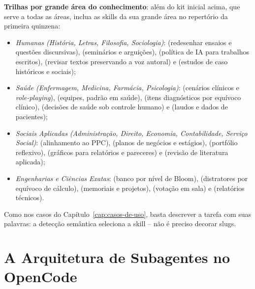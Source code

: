 \begin{adaptacaoarea}
\textbf{Trilhas por grande {\'a}rea do conhecimento}: al{\'e}m do kit inicial acima, que serve a todas as {\'a}reas, inclua as skills da sua grande {\'a}rea no repert{\'o}rio da primeira quinzena:
\begin{itemize}
  \item \emph{Humanas (Hist{\'o}ria, Letras, Filosofia, Sociologia)}:  (redesenhar ensaios e quest{\~o}es discursivas),  (semin{\'a}rios e argui{\c c}{\~o}es),  (pol{\'i}tica de IA para trabalhos escritos),  (revisar textos preservando a voz autoral) e  (estudos de caso hist{\'o}ricos e sociais);
  \item \emph{Sa{\'u}de (Enfermagem, Medicina, Farm{\'a}cia, Psicologia)}:  (cen{\'a}rios cl{\'i}nicos e \emph{role-playing}),  (equipes, padr{\~a}o em sa{\'u}de),  (itens diagn{\'o}sticos por equ{\'i}voco cl{\'i}nico),  (decis{\~o}es de sa{\'u}de sob controle humano) e  (laudos e dados de pacientes);
  \item \emph{Sociais Aplicadas (Administra{\c c}{\~a}o, Direito, Economia, Contabilidade, Servi{\c c}o Social)}:  (alinhamento ao PPC),  (planos de neg{\'o}cios e est{\'a}gios),  (portf{\'o}lio reflexivo),  (gr{\'a}ficos para relat{\'o}rios e pareceres) e  (revis{\~a}o de literatura aplicada);
  \item \emph{Engenharias e Ci{\^e}ncias Exatas}:  (banco por n{\'i}vel de Bloom),  (distratores por equ{\'i}voco de c{\'a}lculo),  (memoriais e projetos),  (vota{\c c}{\~a}o em sala) e  (relat{\'o}rios t{\'e}cnicos).
\end{itemize}
Como nos casos do Cap{\'i}tulo~\ref{cap:casos-de-uso}, basta descrever a tarefa com suas palavras: a detec{\c c}{\~a}o sem{\^a}ntica seleciona a skill -- n{\~a}o {\'e} preciso decorar slugs.
\end{adaptacaoarea}

\section{A Arquitetura de Subagentes no OpenCode}

